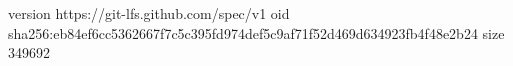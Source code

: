 version https://git-lfs.github.com/spec/v1
oid sha256:eb84ef6cc5362667f7c5c395fd974def5c9af71f52d469d634923fb4f48e2b24
size 349692
